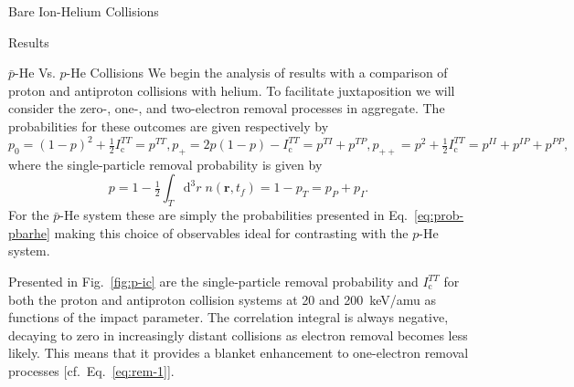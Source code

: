 \documentclass[letterpaper, 11 pt]{report}
\begin{document}
\begin{chapter}{Bare Ion-Helium Collisions \label{chap:p-he2p-he}}
\begin{section}{Results \label{sec:phe2p-res}}
\begin{subsection}{ \texorpdfstring{$\bar{p}$}{pbar}-He Vs. \texorpdfstring{$p$}{p}-He Collisions
                         \label{sec:pbarhe-res}}
         We begin the analysis of results with a comparison of proton and antiproton collisions with
         helium. To facilitate juxtaposition we will consider the zero-, one-, and two-electron removal
         processes in aggregate. The probabilities for these outcomes are given respectively by
         \begin{subequations} \label{eq:remove}
            \begin{equation} \label{eq:rem-0}
               p_0 = (1 - p)^2 + \tfrac{1}{2} I^{TT}_\mathrm{c} = p^{TT},
            \end{equation}
            \begin{equation} \label{eq:rem-1}
               p_+ = 2 p (1-p) - I^{TT}_\mathrm{c} = p^{TI} + p^{TP},
            \end{equation}
            \begin{equation} \label{eq:rem-2}
               p_{++} = p^2 + \tfrac{1}{2} I^{TT}_\mathrm{c} = p^{II} + p^{IP} + p^{PP},
            \end{equation}
         \end{subequations}
         where the single-particle removal probability is given by
         \begin{equation} \label{eq:p-rem}
            p = 1 - \tfrac{1}{2} \int_T \mathrm{d}^3 r \; n(\mathbf{r},t_f)
            = 1 - p_T = p_P + p_I.
         \end{equation}
         For the $\bar{p}$-He system these are simply the probabilities presented in
         Eq.~\eqref{eq:prob-pbarhe} making this choice of observables ideal for contrasting with the
         $p$-He system.

         Presented in Fig.~\ref{fig:p-ic} are the single-particle removal probability and
         $I^{TT}_\mathrm{c}$ for both the proton and antiproton collision systems at 20 and 200~keV/amu
         as functions of the impact parameter. The correlation integral is always negative, decaying to
         zero in increasingly distant collisions as electron removal becomes less likely. This means
         that it provides a blanket enhancement to one-electron removal processes
         [cf.\ Eq.~\eqref{eq:rem-1}].


\end{subsection}
\end{section}
\end{chapter}
\end{document}
